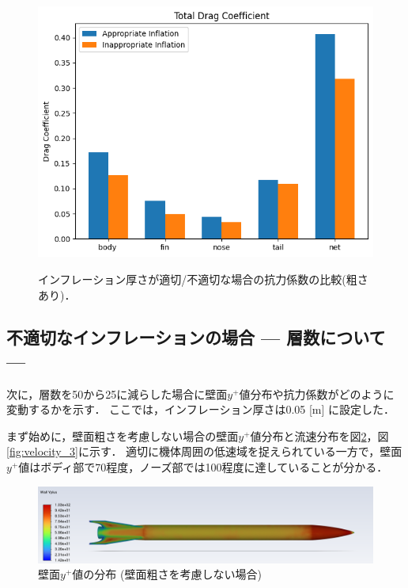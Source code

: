 \documentclass[uplatex,dvipdfmx,a4j,12pt]{jsarticle}
\begin{document}
\begin{figure}[H]
\begin{minipage}{0.45\linewidth}
      \centering
      \includegraphics[width=\linewidth]{wall_function/img/4_2_1_total_drag.png}
      \label{fig:4_2_1_cd_total}
  \end{minipage}
  \caption{インフレーション厚さが適切/不適切な場合の抗力係数の比較(粗さあり)．}
  \label{fig:4_2_cd_w_rough}
\end{figure}

\subsection{不適切なインフレーションの場合 --- 層数について ---}
次に，層数を50から25に減らした場合に壁面$y^+$値分布や抗力係数がどのように変動するかを示す．
ここでは，インフレーション厚さは0.05 [m] に設定した．

まず始めに，壁面粗さを考慮しない場合の壁面$y^+$値分布と流速分布を図\ref{fig:yplus_no_rough_3}，図\ref{fig:velocity_3}に示す．
適切に機体周囲の低速域を捉えられている一方で，壁面$y^+$値はボディ部で70程度，ノーズ部では100程度に達していることが分かる．
\begin{figure}[H]
  \centering
  \includegraphics[width=\linewidth]{wall_function/img/4_3_yplus.png}
  \caption{壁面$y^+$値の分布 (壁面粗さを考慮しない場合)}
  \label{fig:yplus_no_rough_3}
\end{figure}
\end{document}
